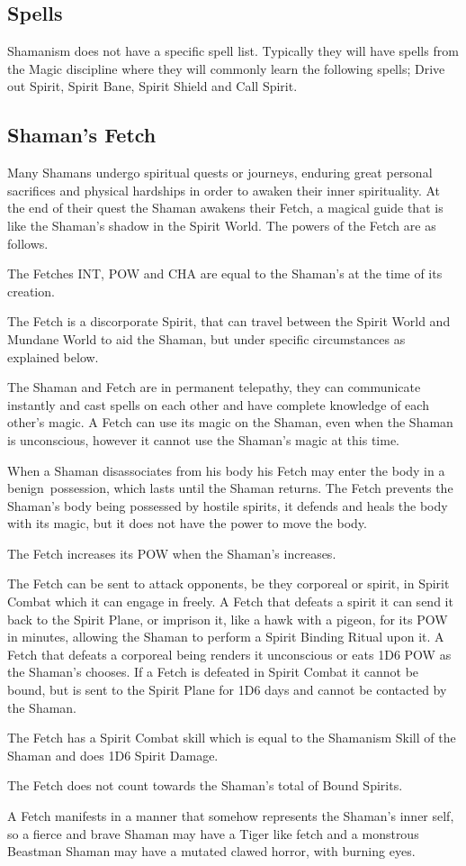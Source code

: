 \subsection{Spells}
Shamanism does not have a specific spell list. Typically they will have spells from the Magic discipline where they will commonly learn the following spells; Drive out Spirit, Spirit Bane, Spirit Shield and Call Spirit.


\subsection{Shaman's Fetch}
Many Shamans undergo spiritual quests or journeys, enduring great personal sacrifices and physical hardships in order to awaken their inner spirituality. At the end of their quest the Shaman awakens their Fetch, a magical guide that is like the Shaman’s shadow in the Spirit World. The powers of the Fetch are as follows.
\begin{rpg-list}
\item The Fetches INT, POW and CHA are equal to the Shaman’s at the time of its creation.
\item The Fetch is a discorporate Spirit, that can travel between the Spirit World and Mundane World to aid the Shaman, but under specific circumstances as explained below.
\item The Shaman and Fetch are in permanent telepathy, they can communicate instantly and cast spells on each other and have complete knowledge of each other’s magic. A Fetch can use its magic on the Shaman, even when the Shaman is unconscious, however it cannot use the Shaman’s magic at this time.
\item When a Shaman disassociates from his body his Fetch may enter the body in a benign possession, which lasts until the Shaman returns. The Fetch prevents the Shaman’s body being possessed by hostile spirits, it defends and heals the body with its magic, but it does not have the power to move the body.
\item The Fetch increases its POW when the Shaman’s increases.
\item The Fetch can be sent to attack opponents, be they corporeal or spirit, in Spirit Combat which it can engage in freely. A Fetch that defeats a spirit it can send it back to the Spirit Plane, or imprison it, like a hawk with a pigeon, for its POW in minutes, allowing the Shaman to perform a Spirit Binding Ritual upon it. A Fetch that defeats a corporeal being renders it unconscious or eats 1D6 POW as the Shaman’s chooses. If a Fetch is defeated in Spirit Combat it cannot be bound, but is sent to the Spirit Plane for 1D6 days and cannot be contacted by the Shaman.
\item The Fetch has a Spirit Combat skill which is equal to the Shamanism Skill of the Shaman and does 1D6 Spirit Damage.
\item The Fetch does not count towards the Shaman’s total of Bound Spirits.
\item A Fetch manifests in a manner that somehow represents the Shaman’s inner self, so a fierce and brave Shaman may have a Tiger like fetch and a monstrous Beastman Shaman may have a mutated clawed horror, with burning eyes.
\end{rpg-list}


